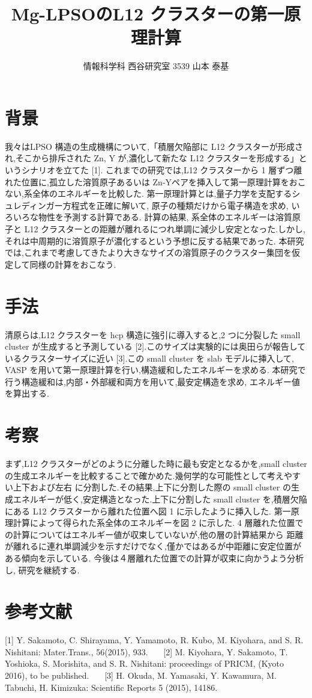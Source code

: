 \documentclass[a4j,twocolumn]{jsarticle}
\begin{document}
\title{Mg-LPSOのL12 クラスターの第一原理計算}
\author{情報科学科 西谷研究室 3539 山本 泰基}
\date{}
\maketitle
\section{背景}
我々はLPSO 構造の生成機構について,「積層欠陥部に L12 クラスターが形成され,そこから排斥された Zn, Y が,濃化して新たな L12 クラスターを形成する」というシナリオを立てた [1]. これまでの研究では,L12 クラスターから 1 層ずつ離れた位置に,孤立した溶質原子あるいは Zn-Yペアを挿入して第一原理計算をおこない,系全体のエネルギーを比較した. 第一原理計算とは,量子力学を支配するシュレディンガー方程式を正確に解いて, 原子の種類だけから電子構造を求め, いろいろな物性を予測する計算である. 計算の結果, 系全体のエネルギーは溶質原子と L12 クラスターとの距離が離れるにつれ単調に減少し安定となった.しかし, それは中周期的に溶質原子が濃化するという予想に反する結果であった. 本研究では,これまで考慮してきたより大きなサイズの溶質原子のクラスター集団を仮定して同様の計算をおこなう.

\section{手法}
清原らは,L12 クラスターを hcp 構造に強引に導入すると,2 つに分裂した small cluster が生成すると予測している [2].このサイズは実験的には奥田らが報告しているクラスターサイズに近い [3].この small cluster を slab モデルに挿入して, VASP を用いて第一原理計算を行い,構造緩和したエネルギーを求める. 本研究で行う構造緩和は,内部・外部緩和両方を用いて,最安定構造を求め, エネルギー値を算出する.

\section{考察}
まず,L12 クラスターがどのように分離した時に最も安定となるかを,small cluster の生成エネルギーを比較することで確かめた.幾何学的な可能性として考えやすい上下および左右 に分割した.その結果,上下に分割した際の small cluster の生成エネルギーが低く,安定構造となった.上下に分割した small cluster を,積層欠陥にある L12 クラスターから離れた位置へ図 1 に示したように挿入した. 第一原理計算によって得られた系全体のエネルギーを図 2 に示した. 4 層離れた位置での計算についてはエネルギー値が収束していないが,他の層の計算結果から 距離が離れるに連れ単調減少を示すだけでなく,僅かではあるが中距離に安定位置がある傾向を示している. 今後は４層離れた位置での計算が収束に向かうよう分析し, 研究を継続する.


\section{参考文献}
[1] Y. Sakamoto, C. Shirayama, Y. Yamamoto, R. Kubo, M. Kiyohara, and S. R. Nishitani: Mater.Trans., 56(2015), 933.
\newline ~~~[2] M. Kiyohara, Y. Sakamoto, T. Yoshioka, S. Morishita, and S. R. Nishitani: proceedings of PRICM, (Kyoto 2016), to be published.
\newline ~~~[3] H. Okuda, M. Yamasaki, Y. Kawamura, M. Tabuchi, H. Kimizuka: Scientific Reports 5 (2015), 14186.
\end{document}

